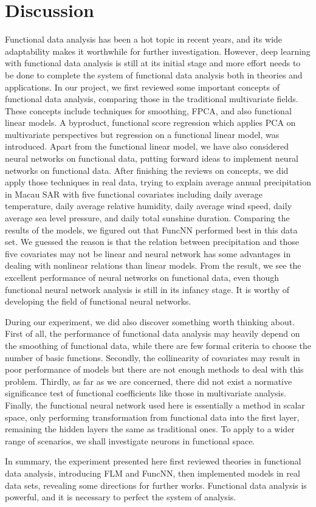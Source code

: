 \section{Discussion}
Functional data analysis has been a hot topic in recent years, and its wide adaptability makes it worthwhile for further investigation. However, deep learning with functional data analysis is still at its initial stage and more effort needs to be done to complete the system of functional data analysis both in theories and applications. In our project, we first reviewed some important concepts of functional data analysis, comparing those in the traditional multivariate fields. These concepts include techniques for smoothing, FPCA, and also functional linear models. A byproduct, functional score regression which applies PCA on multivariate perspectives but regression on a functional linear model, was introduced.  Apart from the functional linear model, we have also considered neural networks on functional data, putting forward ideas to implement neural networks on functional data. After finishing the reviews on concepts, we did apply those techniques in real data, trying to explain average annual precipitation in Macau SAR with five functional covariates including daily average temperature, daily average relative humidity, daily average wind speed, daily average sea level pressure, and daily total sunshine duration. Comparing the results of the models, we figured out that FuncNN performed best in this data set. We guessed the reason is that the relation between precipitation and those five covariates may not be linear and neural network has some advantages in dealing with nonlinear relations than linear models. From the result, we see the excellent performance of neural networks on functional data, even though functional neural network analysis is still in its infancy stage. It is worthy of developing the field of functional neural networks.

During our experiment, we did also discover something worth thinking about. First of all, the performance of functional data analysis may heavily depend on the smoothing of functional data, while there are few formal criteria to choose the number of basic functions. Secondly, the collinearity of covariates may result in poor performance of models but there are not enough methods to deal with this problem. Thirdly, as far as we are concerned, there did not exist a normative significance test of functional coefficients like those in multivariate analysis. Finally, the functional neural network used here is essentially a method in scalar space, only performing transformation from functional data into the first layer, remaining the hidden layers the same as traditional ones. To apply to a wider range of scenarios, we shall investigate neurons in functional space. 

In summary, the experiment presented here first reviewed theories in functional data analysis, introducing FLM and FuncNN, then implemented models in real data sets, revealing some directions for further works. Functional data analysis is powerful, and it is necessary to perfect the system of analysis.




